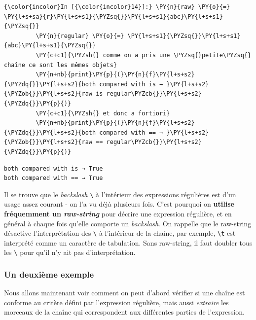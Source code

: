     \begin{Verbatim}[commandchars=\\\{\}]
{\color{incolor}In [{\color{incolor}14}]:} \PY{n}{raw} \PY{o}{=} \PY{l+s+sa}{r}\PY{l+s+s1}{\PYZsq{}}\PY{l+s+s1}{abc}\PY{l+s+s1}{\PYZsq{}}
         \PY{n}{regular} \PY{o}{=} \PY{l+s+s1}{\PYZsq{}}\PY{l+s+s1}{abc}\PY{l+s+s1}{\PYZsq{}}
         \PY{c+c1}{\PYZsh{} comme on a pris une \PYZsq{}petite\PYZsq{} chaîne ce sont les mêmes objets}
         \PY{n+nb}{print}\PY{p}{(}\PY{n}{f}\PY{l+s+s2}{\PYZdq{}}\PY{l+s+s2}{both compared with is → }\PY{l+s+s2}{\PYZob{}}\PY{l+s+s2}{raw is regular\PYZcb{}}\PY{l+s+s2}{\PYZdq{}}\PY{p}{)}
         \PY{c+c1}{\PYZsh{} et donc a fortiori}
         \PY{n+nb}{print}\PY{p}{(}\PY{n}{f}\PY{l+s+s2}{\PYZdq{}}\PY{l+s+s2}{both compared with == → }\PY{l+s+s2}{\PYZob{}}\PY{l+s+s2}{raw == regular\PYZcb{}}\PY{l+s+s2}{\PYZdq{}}\PY{p}{)}
\end{Verbatim}


    \begin{Verbatim}[commandchars=\\\{\}]
both compared with is → True
both compared with == → True

    \end{Verbatim}

    Il se trouve que le \emph{backslash} \texttt{\textbackslash{}} à
l'intérieur des expressions régulières est d'un usage assez courant - on
l'a vu déjà plusieurs fois. C'est pourquoi on \textbf{utilise
fréquemment un \emph{raw-string}} pour décrire une expression régulière,
et en général à chaque fois qu'elle comporte un \emph{backslash}. On
rappelle que le raw-string désactive l'interprétation des
\texttt{\textbackslash{}} à l'intérieur de la chaîne, par exemple,
\texttt{\textbackslash{}t} est interprété comme un caractère de
tabulation. Sans raw-string, il faut doubler tous les
\texttt{\textbackslash{}} pour qu'il n'y ait pas d'interprétation.

    \hypertarget{un-deuxiuxe8me-exemple}{%
\subsubsection{Un deuxième exemple}\label{un-deuxiuxe8me-exemple}}

    Nous allons maintenant voir comment on peut d'abord vérifier si une
chaîne est conforme au critère défini par l'expression régulière, mais
aussi \emph{extraire} les morceaux de la chaîne qui correspondent aux
différentes parties de l'expression.\\


